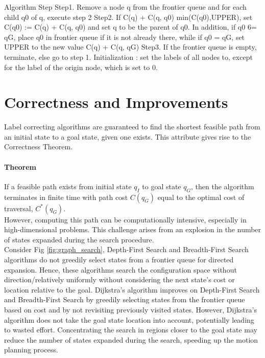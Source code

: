 \documentclass[twoside]{article}
\begin{document}
Algorithm Step
Step1. Remove a node q from the frontier queue and for each child q0 of q, execute step 2
Step2. If C(q) + C(q, q0) min(C(q0),UPPER), set C(q0) := C(q) + C(q, q0) and set q to be the parent of q0. In addition, if q0 6= qG, place q0 in frontier queue if it is not already there, while if q0 = qG, set UPPER to the new value C(q) + C(q, qG)
Step3. If the frontier queue is empty, terminate, else go to step 1.
Initialization : set the labels of all nodes to, except for the label of the origin node, which is set to 0.


\section{Correctness and Improvements}
Label correcting algorithms are guaranteed to find the shortest feasible path from an initial state to a goal state, given one exists. This attribute gives rise to the Correctness Theorem. \vspace{-0.5cm}
\paragraph{Theorem} If a feasible path exists from initial state $q_I$ to goal state $q_G$, then the algorithm terminates in finite time with path cost $C(q_G)$ equal to the optimal cost of traversal, $C^*(q_G)$.\\

However, computing this path can be computationally intensive, especially in high-dimensional problems. This challenge arises from an explosion in the number of states expanded during the search procedure. \\

Consider Fig \ref{fig:graph_search}, Depth-First Search and Breadth-First Search algorithms do not greedily select states from a frontier queue for directed expansion. Hence, these algorithms search the configuration space without direction/relatively uniformly without considering the next state's cost or location relative to the goal. Dijkstra's algorithm improves on Depth-First Search and Breadth-First Search by greedily selecting states from the frontier queue based on cost and by not revisiting previously visited states. However, Dijkstra's algorithm does not take the goal state location into account, potentially leading to wasted effort. Concentrating the search in regions closer to the goal state may reduce the number of states expanded during the search, speeding up the motion planning process.
\end{document}
